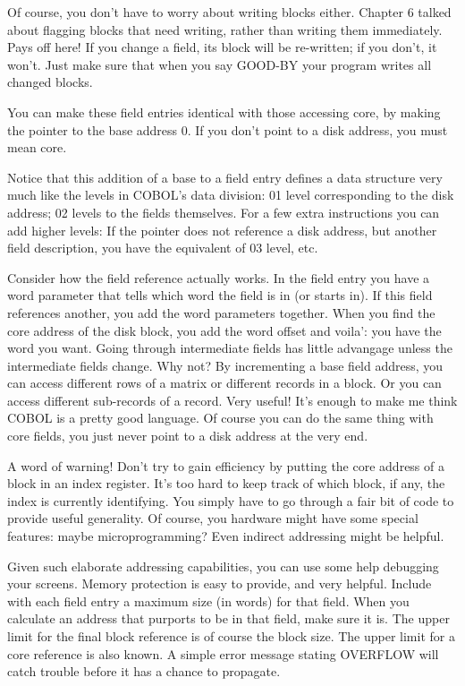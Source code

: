\documentclass[b5paper, oneside]{book}
\begin{document}
Of course, you don't have to worry about writing blocks either. Chapter 6 talked about flagging blocks that need writing, rather than writing them immediately. Pays off here! If you change a field, its block will be re-written; if you don't, it won't. Just make sure that when you say GOOD-BY your program writes all changed blocks.

You can make these field entries identical with those accessing core, by making the pointer to the base address 0. If you don't point to a disk address, you must mean core.

Notice that this addition of a base to a field entry defines a data structure very much like the levels in COBOL's data division: 01 level corresponding to the disk address; 02 levels to the fields themselves. For a few extra instructions you can add higher levels: If the pointer does not reference a disk address, but another field description, you have the equivalent of 03 level, etc.

Consider how the field reference actually works. In the field entry you have a word parameter that tells which word the field is in (or starts in). If this field references another, you add the word parameters together. When you find the core address of the disk block, you add the word offset and voila': you have the word you want. Going through intermediate fields has little advangage unless the intermediate fields change. Why not? By incrementing a base field address, you can access different rows of a matrix or different records in a block. Or you can access different sub-records of a record. Very useful! It's enough to make me think COBOL is a pretty good language. Of course you can do the same thing with core fields, you just never point to a disk address at the very end.

A word of warning! Don't try to gain efficiency by putting the core address of a block in an index register. It's too hard to keep track of which block, if any, the index is currently identifying. You simply have to go through a fair bit of code to provide useful generality. Of course, you hardware might have some special features: maybe microprogramming? Even indirect addressing might be helpful.

Given such elaborate addressing capabilities, you can use some help debugging your screens. Memory protection is easy to provide, and very helpful. Include with each field entry a maximum size (in words) for that field. When you calculate an address that purports to be in that field, make sure it is. The upper limit for the final block reference is of course the block size. The upper limit for a core reference is also known. A simple error message stating OVERFLOW will catch trouble before it has a chance to propagate.
\end{document}
